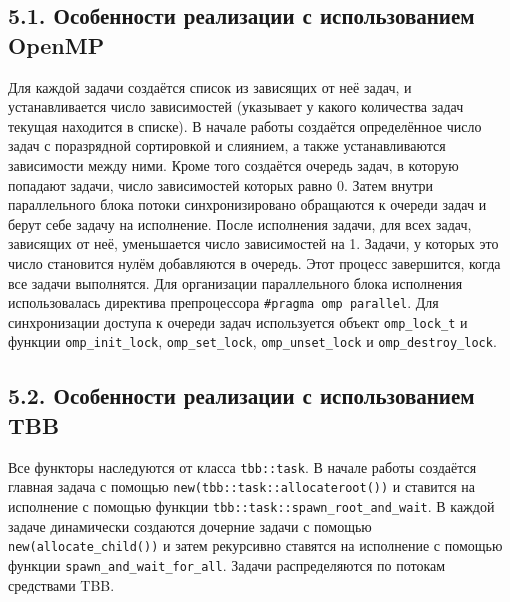 \documentclass{report}
\begin{document}

    \subsection*{5.1. Особенности реализации с использованием OpenMP}
    \par Для каждой задачи создаётся список из зависящих от неё задач, и устанавливается число зависимостей (указывает у какого количества задач текущая находится в списке).
         В начале работы создаётся определённое число задач с поразрядной сортировкой и слиянием, а также устанавливаются зависимости между ними.
         Кроме того создаётся очередь задач, в которую попадают задачи, число зависимостей которых равно 0.
         Затем внутри параллельного блока потоки синхронизировано обращаются к очереди задач и берут себе задачу на исполнение.
         После исполнения задачи, для всех задач, зависящих от неё, уменьшается число зависимостей на 1. Задачи, у которых это число становится нулём добавляются в очередь.
         Этот процесс завершится, когда все задачи выполнятся.
         Для организации параллельного блока исполнения использовалась директива препроцессора \verb|#pragma omp parallel|.
         Для синхронизации доступа к очереди задач используется объект \verb|omp_lock_t| и функции \verb|omp_init_lock|, \verb|omp_set_lock|, \verb|omp_unset_lock| и \verb|omp_destroy_lock|.

    \subsection*{5.2. Особенности реализации с использованием TBB}
    \par Все функторы наследуются от класса \verb|tbb::task|. В начале работы создаётся главная задача с помощью \verb|new(tbb::task::allocateroot())| и ставится на исполнение с помощью функции \verb|tbb::task::spawn_root_and_wait|.
         В каждой задаче динамически создаются дочерние задачи с помощью \verb|new(allocate_child())| и затем рекурсивно ставятся на исполнение с помощью функции \verb|spawn_and_wait_for_all|.
         Задачи распределяются по потокам средствами TBB.
\end{document}
